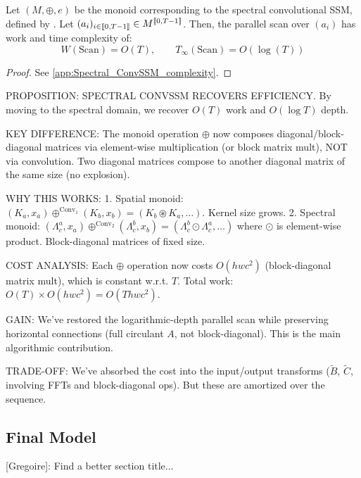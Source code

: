 \documentclass{article}
\newcommand{\greg}[1]{{\color{indigo}[Gregoire]: #1}}
\begin{document}
\begin{proposition}
\label{prop:Spectral_ConvSSM_complexity}
    Let $(M, \oplus, e)$ be the monoid corresponding to the spectral convolutional SSM, defined by . Let $(a_i)_{i\in \llbracket 0, T-1 \rrbracket}\in M^{\llbracket 0, T-1 \rrbracket}$. Then, the parallel scan over $(a_i)$ has work and time complexity of:
\[
    W(\mathrm{Scan}) = O(T), \qquad T_\infty(\mathrm{Scan}) = O(\log(T))
\]
\end{proposition}

\begin{proof}
See \cref{app:Spectral_ConvSSM_complexity}.
\end{proof}

\begin{thomasbox}
PROPOSITION: SPECTRAL CONVSSM RECOVERS EFFICIENCY. By moving to the spectral domain, we recover $O(T)$ work and $O(\log T)$ depth.

KEY DIFFERENCE: The monoid operation $\oplus$ now composes diagonal/block-diagonal matrices via element-wise multiplication (or block matrix mult), NOT via convolution. Two diagonal matrices compose to another diagonal matrix of the same size (no explosion).

WHY THIS WORKS:
1. Spatial monoid: $(K_a, x_a) \oplus^{\mathrm{Conv}_1} (K_b, x_b) = (K_b \circledast K_a, \ldots)$. Kernel size grows.
2. Spectral monoid: $(\Lambda^a_c, x_a) \oplus^{\mathrm{Conv}_2} (\Lambda^b_c, x_b) = (\Lambda^b_c \odot \Lambda^a_c, \ldots)$ where $\odot$ is element-wise product. Block-diagonal matrices of fixed size.

COST ANALYSIS: Each $\oplus$ operation now costs $O(hwc^2)$ (block-diagonal matrix mult), which is constant w.r.t. $T$. Total work: $O(T) \times O(hwc^2) = O(T hwc^2)$.

GAIN: We've restored the logarithmic-depth parallel scan while preserving horizontal connections (full circulant $A$, not block-diagonal). This is the main algorithmic contribution.

TRADE-OFF: We've absorbed the cost into the input/output transforms ($\widetilde{B}$, $\widetilde{C}$, involving FFTs and block-diagonal ops). But these are amortized over the sequence.
\end{thomasbox}

\subsection{Final Model}
\greg{Find a better section title...}
\end{document}
